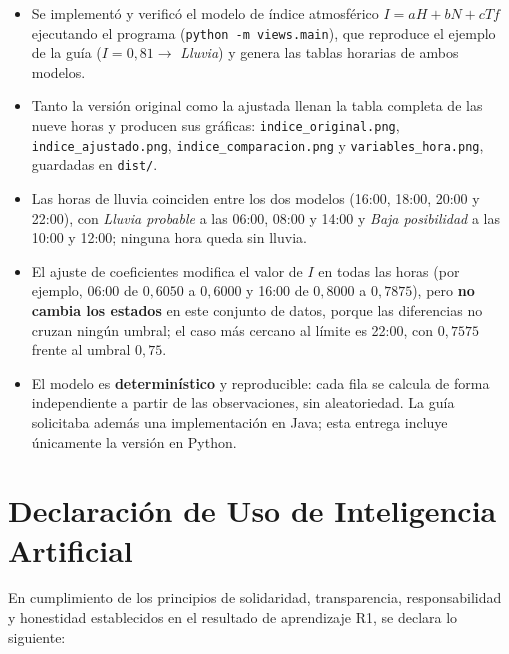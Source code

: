 \documentclass[11pt,a4paper]{article}
\begin{document}
\begin{itemize}[leftmargin=*]
  \item Se implement\'o y verific\'o el modelo de \'indice atmosf\'erico
        $I = aH + bN + cTf$ ejecutando el programa
        (\texttt{python -m views.main}), que reproduce el ejemplo de la gu\'ia
        ($I = 0{,}81 \rightarrow$ \emph{Lluvia}) y genera las tablas horarias de ambos
        modelos.

  \item Tanto la versi\'on original como la ajustada llenan la tabla completa de las
        nueve horas y producen sus gr\'aficas: \texttt{indice\_original.png},
        \texttt{indice\_ajustado.png}, \texttt{indice\_comparacion.png} y
        \texttt{variables\_hora.png}, guardadas en \texttt{dist/}.

  \item Las horas de lluvia coinciden entre los dos modelos (16:00, 18:00, 20:00 y
        22:00), con \emph{Lluvia probable} a las 06:00, 08:00 y 14:00 y \emph{Baja
        posibilidad} a las 10:00 y 12:00; ninguna hora queda sin lluvia.

  \item El ajuste de coeficientes modifica el valor de $I$ en todas las horas
        (por ejemplo, 06:00 de $0{,}6050$ a $0{,}6000$ y 16:00 de $0{,}8000$ a
        $0{,}7875$), pero \textbf{no cambia los estados} en este conjunto de datos,
        porque las diferencias no cruzan ning\'un umbral; el caso m\'as cercano al l\'imite
        es 22:00, con $0{,}7575$ frente al umbral $0{,}75$.

  \item El modelo es \textbf{determin\'istico} y reproducible: cada fila se calcula de
        forma independiente a partir de las observaciones, sin aleatoriedad. La gu\'ia
        solicitaba adem\'as una implementaci\'on en Java; esta entrega incluye
        \'unicamente la versi\'on en Python.
\end{itemize}

\newpage

\section{Declaraci\'on de Uso de Inteligencia Artificial}

En cumplimiento de los principios de solidaridad, transparencia, responsabilidad y
honestidad establecidos en el resultado de aprendizaje R1, se declara lo siguiente:
\end{document}
